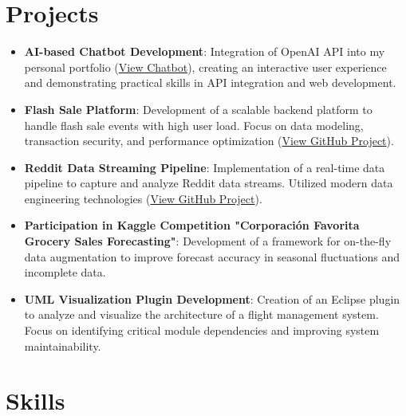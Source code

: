 \documentclass[10pt, letterpaper]{article}
\begin{document}
    
    
\section{Projects}

\begin{itemize}[leftmargin=*]
\item \textbf{AI-based Chatbot Development}:  
Integration of OpenAI API into my personal portfolio (\href{https://personal-portfolio-mohamedayadidat.replit.app/chat}{View Chatbot}), creating an interactive user experience and demonstrating practical skills in API integration and web development.

\item \textbf{Flash Sale Platform}:  
Development of a scalable backend platform to handle flash sale events with high user load. Focus on data modeling, transaction security, and performance optimization (\href{https://github.com/Mayedi007/flash-sale-platform}{View GitHub Project}).

\item \textbf{Reddit Data Streaming Pipeline}:  
Implementation of a real-time data pipeline to capture and analyze Reddit data streams. Utilized modern data engineering technologies (\href{https://github.com/Mayedi007/reddit-data-streaming-pipeline}{View GitHub Project}).

\item \textbf{Participation in Kaggle Competition "Corporación Favorita Grocery Sales Forecasting"}:  
Development of a framework for on-the-fly data augmentation to improve forecast accuracy in seasonal fluctuations and incomplete data.

\item \textbf{UML Visualization Plugin Development}:  
Creation of an Eclipse plugin to analyze and visualize the architecture of a flight management system. Focus on identifying critical module dependencies and improving system maintainability.
\end{itemize}









        \vspace{0.2 cm}

        
          

    
   

\section{Skills}
\end{document}
